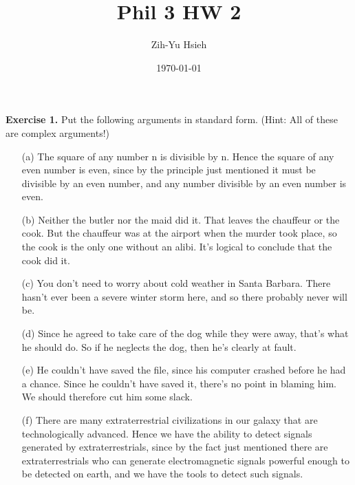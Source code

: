\documentclass{article}
\title{Phil 3 HW 2}
\author{Zih-Yu Hsieh}
\date{\today}
\begin{document}
\maketitle

\begin{ques}\label{q1}
\textbf{Exercise 1.} Put the following arguments in standard form. (Hint: All of these are complex arguments!)

\begin{enumerate}
\item[(a)] The square of any number n is divisible by n. Hence the square of any even number is even, since by the principle just mentioned it must be divisible by an even number, and any number divisible by an even number is even.

\item[(b)] Neither the butler nor the maid did it. That leaves the chauffeur or the cook. But the chauffeur was at the airport when the murder took place, so the cook is the only one without an alibi. It’s logical to conclude that the cook did it.

\item[(c)] You don’t need to worry about cold weather in Santa Barbara. There hasn’t ever been a severe winter storm here, and so there probably never will be.

\item[(d)] Since he agreed to take care of the dog while they were away, that’s what he should do. So if he neglects the dog, then he’s clearly at fault.

\item[(e)] He couldn’t have saved the file, since his computer crashed before he had a chance. Since he couldn’t have saved it, there’s no point in blaming him. We should therefore cut him some slack.

\item[(f)] There are many extraterrestrial civilizations in our galaxy that are technologically advanced. Hence we have the ability to detect signals generated by extraterrestrials, since by the fact just mentioned there are extraterrestrials who can generate electromagnetic signals powerful enough to be detected on earth, and we have the tools to detect such signals.
\end{enumerate}
\end{ques}
\end{document}
